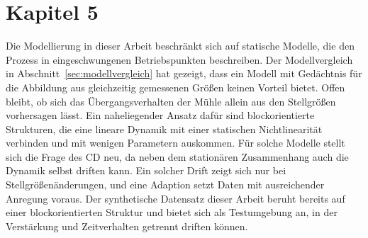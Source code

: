 
\chapter{Kapitel 5} \label{cap:Kap_5}

%
%
%
%
%
Die Modellierung in dieser Arbeit beschränkt sich auf statische Modelle, die den Prozess in eingeschwungenen Betriebspunkten beschreiben. Der Modellvergleich in Abschnitt~\ref{sec:modellvergleich} hat gezeigt, dass ein Modell mit Gedächtnis für die Abbildung aus gleichzeitig gemessenen Größen keinen Vorteil bietet. Offen bleibt, ob sich das Übergangsverhalten der Mühle allein aus den Stellgrößen vorhersagen lässt. Ein naheliegender Ansatz dafür sind blockorientierte Strukturen, die eine lineare Dynamik mit einer statischen Nichtlinearität verbinden und mit wenigen Parametern auskommen. Für solche Modelle stellt sich die Frage des \ac{CD} neu, da neben dem stationären Zusammenhang auch die Dynamik selbst driften kann. Ein solcher Drift zeigt sich nur bei Stellgrößenänderungen, und eine Adaption setzt Daten mit ausreichender Anregung voraus. Der synthetische Datensatz dieser Arbeit beruht bereits auf einer blockorientierten Struktur und bietet sich als Testumgebung an, in der Verstärkung und Zeitverhalten getrennt driften können.
